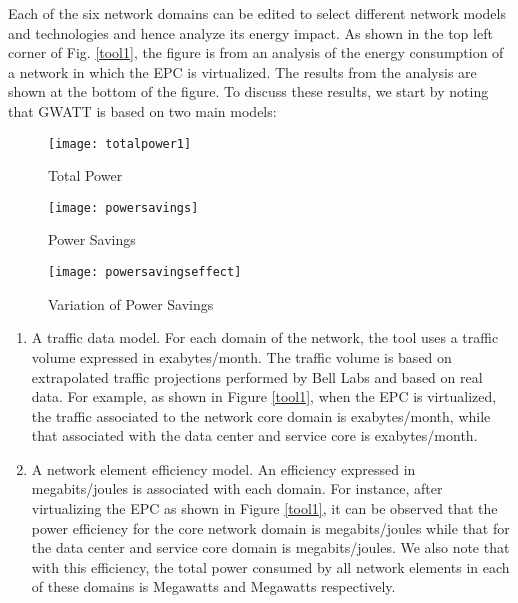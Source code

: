 \documentclass[conference]{IEEEtran}
\begin{document}
Each of the six network domains can be edited to select different network models and technologies and hence analyze its energy impact. As shown in the top left corner of Fig. \ref{tool1}, the figure is from an analysis of the energy consumption of a network in which the EPC is virtualized. The results from the analysis are shown at the bottom of the figure. To discuss these results, we start by noting that GWATT is based on two main models:
\begin{figure*}[!ht]
\begin{minipage}{.33\textwidth}
\centering
\resizebox{.95\textwidth}{!}
{\texttt{[image: totalpower1]}}
  \caption{Total Power}
  \label{totalpower}
\end{minipage}
\begin{minipage}{.33\textwidth}
\centering
\resizebox{.95\textwidth}{!}
{\texttt{[image: powersavings]}}
  \caption{Power Savings}
  \label{powersavings}
\end{minipage}
\begin{minipage}{.33\textwidth}
\centering
\resizebox{.95\textwidth}{!}
{\texttt{[image: powersavingseffect]}}
  \caption{Variation of Power Savings}
  \label{powersavingseffect}
\end{minipage}
\end{figure*}

\begin{enumerate}
\item A traffic data model. For each domain of the network, the tool uses a traffic volume expressed in exabytes/month. The traffic volume is based on extrapolated traffic projections performed by Bell Labs and based on real data. For example, as shown in Figure \ref{tool1}, when the EPC is virtualized, the traffic associated to the network core domain is  exabytes/month, while that associated with the data center and service core is  exabytes/month.\\
\item A network element efficiency model. An efficiency expressed in megabits/joules is associated with each domain. For instance, after virtualizing the EPC as shown in Figure \ref{tool1}, it can be observed that the power efficiency for the core network domain is  megabits/joules while that for the data center and service core domain is  megabits/joules. We also note that with this efficiency, the total power consumed by all network elements in each of these domains is  Megawatts and  Megawatts respectively.
\end{enumerate}
\end{document}
